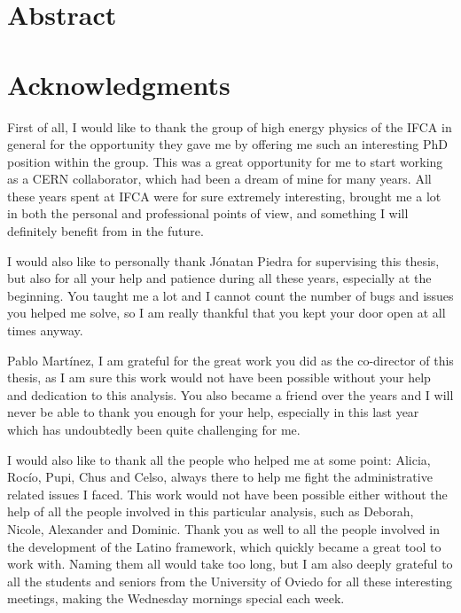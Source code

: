 \documentclass[a4paper, 10pt, openright]{report}
\begin{document}
\thispagestyle{empty}
\phantom{a}
\vfill
\newpage


\setlength{\parskip}{5pt}
\setcounter{page}{1}

\chapter*{Abstract}
\newpage
%

\chapter*{Acknowledgments}

First of all, I would like to thank the group of high energy physics of the \ac{IFCA} in general for the opportunity they gave me by offering me such an interesting PhD position within the group. This was a great opportunity for me to start working as a CERN collaborator, which had been a dream of mine for many years. All these years spent at \ac{IFCA} were for sure extremely interesting, brought me a lot in both the personal and professional points of view, and something I will definitely benefit from in the future.

I would also like to personally thank J\'{o}natan Piedra for supervising this thesis, but also for all your help and patience during all these years, especially at the beginning. You taught me a lot and I cannot count the number of bugs and issues you helped me solve, so I am really thankful that you kept your door open at all times anyway.

Pablo Mart\'{i}nez, I am grateful for the great work you did as the co-director of this thesis, as I am sure this work would not have been possible without your help and dedication to this analysis. You also became a friend over the years and I will never be able to thank you enough for your help, especially in this last year which has undoubtedly been quite challenging for me. 

I would also like to thank all the people who helped me at some point: Alicia, Roc\'{i}o, Pupi, Chus and Celso, always there to help me fight the administrative related issues I faced. This work would not have been possible either without the help of all the people involved in this particular analysis, such as Deborah, Nicole, Alexander and Dominic. Thank you as well to all the people involved in the development of the Latino framework, which quickly became a great tool to work with. Naming them all would take too long, but I am also deeply grateful to all the students and seniors from the University of Oviedo for all these interesting meetings, making the Wednesday mornings special each week. 
\end{document}
